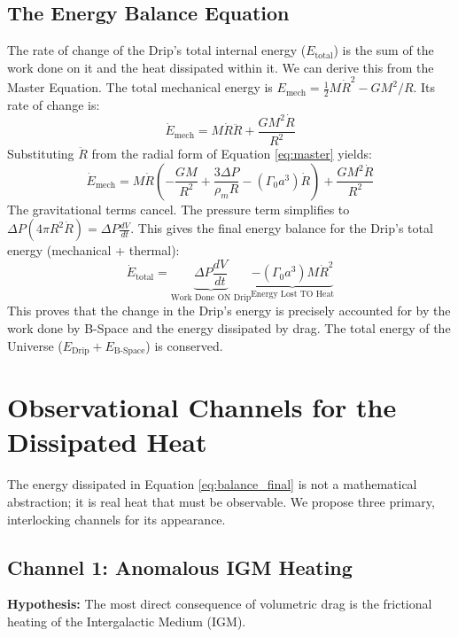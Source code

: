 \documentclass{BSpacePaper} %
\begin{document}
\subsection{The Energy Balance Equation}
The rate of change of the Drip's total internal energy ($E_{\text{total}}$) is the sum of the work done on it and the heat dissipated within it. We can derive this from the Master Equation. The total mechanical energy is $E_{\text{mech}} = \frac{1}{2}M\dot{R}^2 - GM^2/R$. Its rate of change is:
\begin{equation}
    \dot{E}_{\text{mech}} = M\dot{R}\ddot{R} + \frac{GM^2\dot{R}}{R^2}
\end{equation}
Substituting $\ddot{R}$ from the radial form of Equation \ref{eq:master} yields:
\begin{equation}
    \dot{E}_{\text{mech}} = M\dot{R}\left(-\frac{GM}{R^2} + \frac{3\Delta P}{\rho_m R} - (\Gamma_0 a^3)\dot{R}\right) + \frac{GM^2\dot{R}}{R^2}
\end{equation}
The gravitational terms cancel. The pressure term simplifies to $\Delta P (4\pi R^2 \dot{R}) = \Delta P \frac{dV}{dt}$. This gives the final energy balance for the Drip's total energy (mechanical + thermal):
\begin{equation}
    \dot{E}_{\text{total}} = \underbrace{\Delta P \frac{dV}{dt}}_{\text{Work Done ON Drip}} \underbrace{- (\Gamma_0 a^3) M \dot{R}^2}_{\text{Energy Lost TO Heat}}
    \label{eq:balance_final}
\end{equation}
This proves that the change in the Drip's energy is precisely accounted for by the work done by B-Space and the energy dissipated by drag. The total energy of the Universe ($E_{\text{Drip}} + E_{\text{B-Space}}$) is conserved.

\section{Observational Channels for the Dissipated Heat}
The energy dissipated in Equation \ref{eq:balance_final} is not a mathematical abstraction; it is real heat that must be observable. We propose three primary, interlocking channels for its appearance.

\subsection{Channel 1: Anomalous IGM Heating}
\textbf{Hypothesis:} The most direct consequence of volumetric drag is the frictional heating of the Intergalactic Medium (IGM).
\end{document}
